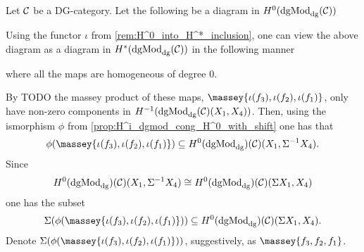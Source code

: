 \begin{remark}
    \label{rem:massey_in_H^0(dgMod_dg)}
    Let \( {\mathcal{C}} \) be a DG-category. Let the following be a diagram in \( H^0(\operatorname{dgMod}_{\operatorname{dg}}({\mathcal{C}})) \)
    \begin{center}
    \end{center}
    Using the functor \( \iota \) from \autoref{rem:H^0_into_H^*_inclusion}, one can view the above diagram as a diagram in \( H^*(\operatorname{dgMod}_{\operatorname{dg}}({\mathcal{C}})) \) in the following manner
    \begin{center}
    \end{center}
    where all the maps are homogeneous of degree \( 0 \).

    By TODO the massey product of these maps, \( \massey{\iota(f_3), \iota(f_2), \iota(f_1)} \), only have non-zero components in \( H^{-1}(\operatorname{dgMod}_{\operatorname{dg}}({\mathcal{C}})(X_1, X_4)) \). Then, using the ismorphism \( \phi \) from \autoref{prop:H^i_dgmod_cong_H^0_with_shift} one has that
    \[
        \phi(\massey{\iota(f_3), \iota(f_2), \iota(f_1)}) \subseteq H^0(\dgMod_{\dg})(\Cc)(X_1, \Sigma^{-1} X_4).
    \]
    Since
    \[
        H^0(\operatorname{dgMod}_{\operatorname{dg}})({\mathcal{C}})(X_1, \Sigma^{-1} X_4) \cong H^0(\operatorname{dgMod}_{\operatorname{dg}})({\mathcal{C}})(\Sigma X_1, X_4)
    \]
    one has the subset
    \[
        \Sigma(\phi(\massey{\iota(f_3), \iota(f_2), \iota(f_1)})) \subseteq H^0(\dgMod_{\dg})(\Cc)(\Sigma X_1, X_4).
    \]
    Denote \( \Sigma(\phi(\massey{\iota(f_3), \iota(f_2), \iota(f_1)})) \), suggestively, as \( \massey{f_3, f_2, f_1} \).
\end{remark}

